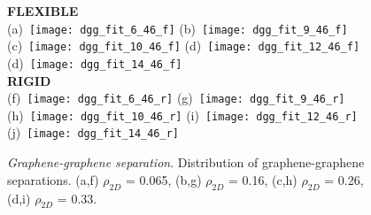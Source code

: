 \documentclass[12pt]{article}
\begin{document}
\begin{figure}[h!]
	\centering
	\textbf{FLEXIBLE} \\
	(a)~\texttt{[image: dgg\_fit\_6\_46\_f]} 
	(b)~\texttt{[image: dgg\_fit\_9\_46\_f]}
	(c)~\texttt{[image: dgg\_fit\_10\_46\_f]}
	(d)~\texttt{[image: dgg\_fit\_12\_46\_f]}
	(d)~\texttt{[image: dgg\_fit\_14\_46\_f]} \\  \vspace{-5pt} 
	\textbf{RIGID} \\
	(f)~\texttt{[image: dgg\_fit\_6\_46\_r]} 
	(g)~\texttt{[image: dgg\_fit\_9\_46\_r]}
	(h)~\texttt{[image: dgg\_fit\_10\_46\_r]}
	(i)~\texttt{[image: dgg\_fit\_12\_46\_r]}
	(j)~\texttt{[image: dgg\_fit\_14\_46\_r]}
	\caption{\textit{Graphene-graphene separation}. Distribution of graphene-graphene separations. (a,f) \(\rho_{2D}\) = 0.065, (b,g) \(\rho_{2D}\) = 0.16, (c,h) \(\rho_{2D}\) = 0.26, (d,i) \(\rho_{2D}\) = 0.33.}
	\label{fig:dgg_distribution}
\end{figure}
\end{document}
